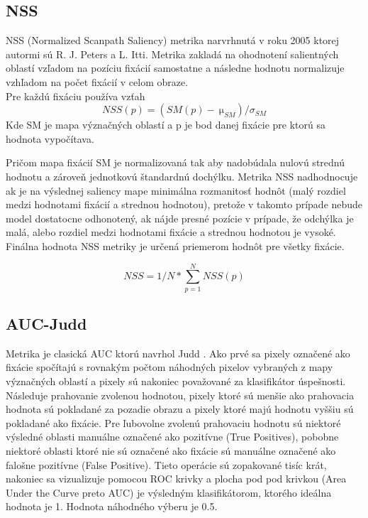 \subsection{NSS}
NSS (Normalized Scanpath Saliency) metrika narvrhnutá v roku 2005 ktorej autormi sú R. J. Peters a L. Itti.
Metrika zakladá na ohodnotení salientných oblastí vzľadom na pozíciu fixácií samostatne a následne hodnotu normalizuje vzhľadom na počet fixácií v celom obraze\cite{metrics-1}.
\\
Pre každú fixáciu používa vzťah
  \begin{equation}
    NSS(p) =  (SM(p)-\SI{}{\micro}_{SM}) / 	\sigma_{SM}
  \end{equation}
Kde SM je mapa význačných oblastí a p je bod danej fixácie pre ktorú sa hodnota vypočítava.

Pričom mapa fixácií SM je normalizovaná tak aby nadobúdala nulovú strednú hodnotu a zároveň jednotkovú štandardnú dochýlku.
Metrika NSS nadhodnocuje ak je na výslednej saliency mape minimálna rozmanitosť hodnôt (malý rozdiel medzi hodnotami fixácií a strednou hodnotou), pretože v takomto prípade nebude model dostatocne odhonotený, ak nájde presné pozície v prípade, že odchýlka je malá, alebo
rozdiel medzi hodnotami fixácie a strednou hodnotou je vysoké.
Finálna hodnota NSS metriky je určená priemerom hodnôt pre všetky fixácie\cite{metrics-1}.

\begin{equation}
  NSS = 1/N * \sum_{p=1}^{N}NSS(p)
\end{equation}

\subsection{AUC-Judd}
Metrika je clasická AUC ktorú navrhol Judd \cite{auc-judd}.
Ako prvé sa pixely označené ako fixácie spočítajú s rovnakým počtom náhodných pixelov vybraných z mapy význačných oblastí a pixely sú nakoniec považované za klasifikátor úspešnosti.
Následuje prahovanie zvolenou hodnotou, pixely ktoré sú menšie ako prahovacia hodnota sú pokladané za pozadie obrazu a pixely ktoré majú hodnotu vyššiu sú pokladané ako fixácie.
Pre ľubovolne zvolenú prahovaciu hodnotu sú niektoré výsledné oblasti manuálne označené ako pozitívne (True Positives), pobobne niektoré oblasti ktoré nie sú označené ako fixácie sú manuálne označené ako falošne pozitívne (False Positive).
Tieto operácie sú zopakované tisíc krát, nakoniec sa vizualizuje pomocou ROC krivky a plocha pod pod krivkou (Area Under the Curve preto AUC) je výsledným klasifikátorom, ktorého ideálna hodnota je 1.
Hodnota náhodného výberu je 0.5.

